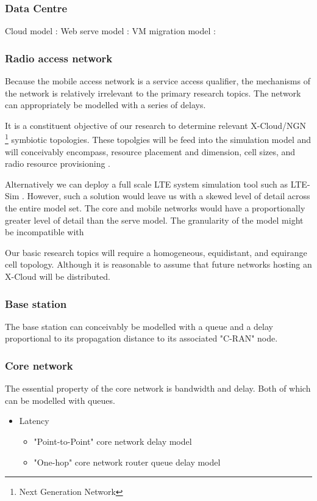 \subsubsection{Data Centre}
Cloud model : \cite{5959161}
Web serve model : \cite{1191656}
VM migration model : \cite{6008692,5581607,voorsluys2009cost,6008747}

\subsubsection{Radio access network}
Because the mobile access network is a service access qualifier, the mechanisms of the network is relatively irrelevant to the primary research topics. The network can appropriately be modelled with a series of delays. 

It is a constituent objective of our research to determine relevant X-Cloud/NGN \footnote{Next Generation Network} symbiotic topologies. These topolgies will be feed into the simulation model and will conceivably encompass, resource placement and dimension, cell sizes, and radio resource provisioning \cite{kwan2010mobility,racz2007handover,salo2010practical}.

Alternatively we can deploy a full scale LTE system simulation tool such as LTE-Sim \cite{5634134}. However, such a solution would leave us with a skewed level of detail across the entire model set. The core and mobile networks would have a proportionally greater level of detail than the serve model. The granularity of the model might be incompatible with 

Our basic research topics will require a homogeneous, equidistant, and equirange cell topology. Although it is reasonable to assume that future networks hosting an X-Cloud will be distributed. 

\subsubsection{Base station}
The base station can conceivably be modelled with a queue and a delay proportional to its propagation distance to its associated "C-RAN" node.

\subsubsection{Core network}
The essential property of the core network is bandwidth and delay. Both of which can be modelled with queues.

\begin{itemize}
\item Latency
\begin{itemize}
\item "Point-to-Point" core network delay model \cite{choi2007analysis}
\item "One-hop" core network router queue delay model  \cite{papagiannaki2003measurement}
\end{itemize}
\end{itemize}

